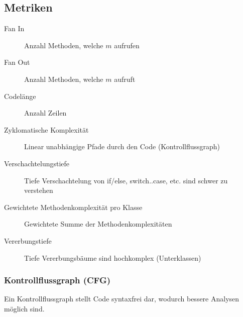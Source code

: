 \documentclass[ngerman]{tuda_summary}
\begin{document}
\subsection{Metriken}
\label{sec:metrics}

\begin{description}
    \item[Fan In] Anzahl Methoden, welche $ m $ aufrufen
    \item[Fan Out] Anzahl Methoden, welche $ m $ aufruft
    \item[Codelänge] Anzahl Zeilen
    \item[Zyklomatische Komplexität] Linear unabhängige Pfade durch den Code (Kontrollflussgraph)
    \item[Verschachtelungstiefe] Tiefe Verschachtelung von if/else, switch..case, etc. sind schwer zu verstehen
    \item[Gewichtete Methodenkomplexität pro Klasse] Gewichtete Summe der Methodenkomplexitäten
    \item[Vererbungstiefe] Tiefe Vererbungsbäume sind hochkomplex (Unterklassen)
\end{description}

\subsubsection{Kontrollflussgraph (CFG)}
\label{diagram:cfg}

Ein Kontrollflussgraph stellt Code syntaxfrei dar, wodurch bessere Analysen möglich sind.
\end{document}

